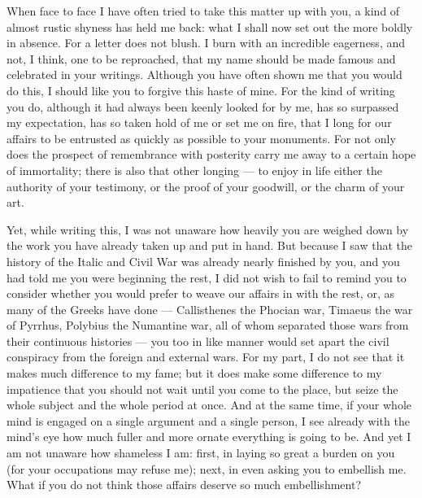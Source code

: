 

 When face to face I have often tried to take this matter up with you, a kind of almost rustic shyness has held me back: what I shall now set out the more boldly in absence. For a letter does not blush. I burn with an incredible eagerness, and not, I think, one to be reproached, that my name should be made famous and celebrated in your writings. Although you have often shown me that you would do this, I should like you to forgive this haste of mine. For the kind of writing you do, although it had always been keenly looked for by me, has so surpassed my expectation, has so taken hold of me or set me on fire, that I long for our affairs to be entrusted as quickly as possible to your monuments. For not only does the prospect of remembrance with posterity carry me away to a certain hope of immortality; there is also that other longing --- to enjoy in life either the authority of your testimony, or the proof of your goodwill, or the charm of your art.

 Yet, while writing this, I was not unaware how heavily you are weighed down by the work you have already taken up and put in hand. But because I saw that the history of the Italic and Civil War was already nearly finished by you, and you had told me you were beginning the rest, I did not wish to fail to remind you to consider whether you would prefer to weave our affairs in with the rest, or, as many of the Greeks have done --- Callisthenes the Phocian war, Timaeus the war of Pyrrhus, Polybius the Numantine war, all of whom separated those wars from their continuous histories --- you too in like manner would set apart the civil conspiracy from the foreign and external wars. For my part, I do not see that it makes much difference to my fame; but it does make some difference to my impatience that you should not wait until you come to the place, but seize the whole subject and the whole period at once. And at the same time, if your whole mind is engaged on a single argument and a single person, I see already with the mind's eye how much fuller and more ornate everything is going to be. And yet I am not unaware how shameless I am: first, in laying so great a burden on you (for your occupations may refuse me); next, in even asking you to embellish me. What if you do not think those affairs deserve so much embellishment?

